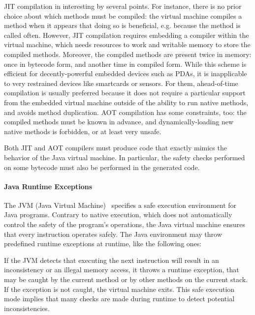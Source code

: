 JIT compilation in interesting by several points. For instance, there is no prior choice about which methods must be compiled: the virtual machine compiles a method when it appears that doing so is beneficial, e.g. because the method is called often. However, JIT compilation requires embedding a compiler within the virtual machine, which needs resources to work and writable memory to store the compiled methods. Moreover, the compiled methods are present twice in memory: once in bytecode form, and another time in compiled form. While this scheme is efficient for decently-powerful embedded devices such as PDAs, it is inapplicable to very restrained devices like smartcards or sensors. For them, ahead-of-time compilation is usually preferred because it does not require a particular support from the embedded virtual machine outside of the ability to run native methods, and avoids method duplication. AOT compilation has some constraints, too: the compiled methods must be known in advance, and dynamically-loading new native methods is forbidden, or at least very unsafe.

Both JIT and AOT compilers must produce code that exactly mimics the behavior of the Java virtual machine. In particular, the safety checks performed on some bytecode must also be performed in the generated code.

\paragraph{Java Runtime Exceptions}
\label{sec:runtimeexceptions}
The JVM (Java Virtual Machine)~\cite{VMSpec} specifies a safe execution environment for Java programs. Contrary to native execution, which does not automatically control the safety of the program's operations, the Java virtual machine ensures that every instruction operates safely. The Java environment may throw predefined runtime exceptions at runtime, like the following ones:

If the JVM detects that executing the next instruction will result in an inconsistency or an illegal memory access, it throws a runtime exception, that may be caught by the current method or by other methods on the current stack. If the exception is not caught, the virtual machine exits. This safe execution mode implies that many checks are made during runtime to detect potential inconsistencies. 

